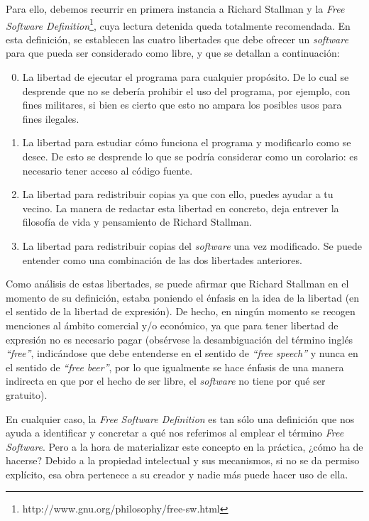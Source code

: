 Para ello, debemos recurrir en primera instancia a Richard Stallman y la
\textit{Free
Software Definition}\footnote{http://www.gnu.org/philosophy/free-sw.html}, cuya
lectura detenida queda totalmente recomendada. En esta definición, se establecen
las cuatro libertades que debe ofrecer un \textit{software} para que pueda ser
considerado como libre, y que se detallan a continuación:

\begin{enumerate}
  \setcounter{enumi}{-1}
  \item La libertad de ejecutar el programa para cualquier propósito. De lo
cual se desprende que no se debería prohibir el uso del programa, por ejemplo,
con fines militares, si bien es cierto que esto no ampara los posibles usos para
fines ilegales.
  \item La libertad para estudiar cómo funciona el programa y modificarlo como
se desee. De esto se desprende lo que se podría considerar como un corolario:
es necesario tener acceso al código fuente.
  \item La libertad para redistribuir copias ya que con ello, puedes ayudar a
tu vecino. La manera de redactar esta libertad en concreto, deja entrever la
filosofía de vida y pensamiento de Richard Stallman.
  \item La libertad para redistribuir copias del \textit{software} una vez
modificado. Se puede entender como una combinación de las dos libertades
anteriores.
\end{enumerate}

Como análisis de estas libertades, se puede afirmar que Richard Stallman en el
momento de su definición, estaba poniendo el énfasis en la idea de la libertad
(en el sentido de la libertad de expresión). De hecho, en ningún momento se
recogen menciones al ámbito comercial y/o económico, ya que para tener libertad
de expresión no es necesario pagar (obsérvese la desambiguación del término
inglés \textit{``free''}, indicándose que debe entenderse en el sentido de
\textit{``free speech''} y nunca en el sentido de \textit{``free beer''}, por lo
que igualmente se hace énfasis de una manera indirecta en que por el hecho de
ser libre, el \textit{software} no tiene por qué ser gratuito).

En cualquier caso, la \textit{Free Software Definition} es tan sólo una
definición que nos ayuda a identificar y concretar a qué nos referimos al
emplear el término \textit{Free Software}. Pero a la hora de materializar este
concepto en la práctica, ¿cómo ha de hacerse? Debido a la propiedad intelectual
y sus mecanismos, si no se da permiso explícito, esa obra pertenece a su creador
y nadie más puede hacer uso de ella.

